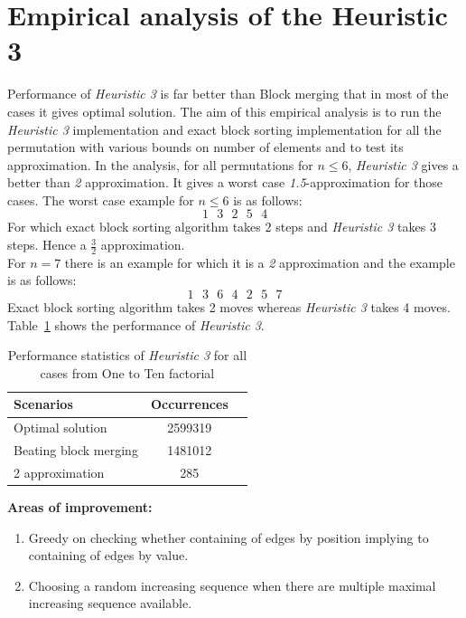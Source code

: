 \documentclass[BTech]{iitmdiss}
\begin{document}
\section{Empirical analysis of the Heuristic 3}
Performance of \textit{Heuristic 3} is far better than Block merging that in most of the cases it gives optimal solution. The aim of this empirical analysis is to run the \textit{Heuristic 3} implementation and exact block sorting implementation for all the permutation with various bounds on number of elements and to test its approximation. In the analysis, for all permutations for $n \leq 6$, \textit{Heuristic 3} gives a better than \textit{2} approximation. It gives a worst case \textit{1.5}-approximation for those cases. The worst case example for $n\leq 6$ is as follows:
$$1\text{ } 3\text{ } 2\text{ } 5\text{ } 4$$
For which exact block sorting algorithm takes 2 steps and \textit{Heuristic 3} takes 3 steps. Hence a $\frac{3}{2}$ approximation.\\
For $n=7$ there is an example for which it is a \textit{2} approximation and the example is as follows:
$$1\text{ } 3\text{ } 6\text{ } 4\text{ } 2\text{ } 5\text{ } 7$$
Exact block sorting algorithm takes 2 moves whereas \textit{Heuristic 3} takes 4 moves.\\
Table~\ref{tab:heursat1} shows the performance of \textit{Heuristic 3}.
\begin{table}[htbp]
  \caption{Performance statistics of \textit{Heuristic 3} for all cases from One to Ten factorial}
  \begin{center}
  \begin{tabular}[c]{|l|c|c|} \hline
    \textbf{Scenarios} & \textbf{Occurrences}\\ \hline
    Optimal solution & 2599319  \\ \hline
    Beating block merging & 1481012 \\ \hline
    2 approximation & 285 \\ \hline
  \end{tabular}
  \label{tab:heursat1}
  \end{center}
\end{table}

\textbf{Areas of improvement:}
\begin{enumerate}
	\item Greedy on checking whether containing of edges by position implying to containing of edges by value.
	\item Choosing a random increasing sequence when there are multiple maximal increasing sequence available.
\end{enumerate}
   
\end{document}
